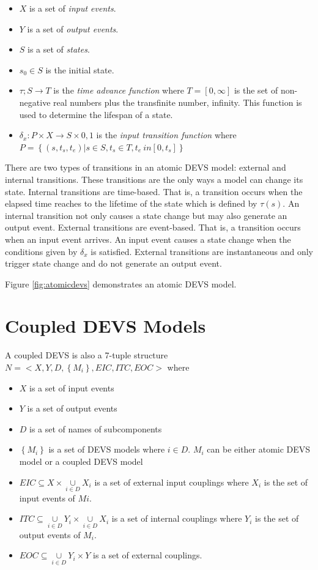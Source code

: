 \begin{itemize}
 \item $X$ is a set of \textit{input events}.
 \item $Y$ is a set of \textit{output events}.
 \item $S$ is a set of \textit{states}.
 \item $s_{0} \in S$ is the initial state.
 \item $\tau ; S \rightarrow T$ is the \textit{time advance function} where $T = [0,\infty]$ is the set of non-negative real numbers plus the transfinite number, infinity. This function is used to determine the lifespan of a state.
 \item $\delta_{x} : P \times X \rightarrow S \times {0,1}$ is the \textit{input transition function} where $P = \left\{(s, t_{s}, t_{e}) | s \in S, t_{s} \in T, t_{e} \ in [0, t_{s}]\right\}$
\end{itemize}

There are two types of transitions in an atomic DEVS model: external and internal transitions. These transitions are the only ways a model can change its state. Internal transitions are time-based. That is, a transition occurs when the elapsed time reaches to the lifetime of the state which is defined by $\tau(s)$. An internal transition not only causes a state change but may also generate an output event. External transitions are event-based. That is, a transition occurs when an input event arrives. An input event causes a state change when the conditions given by $\delta_{x}$ is satisfied. External transitions are instantaneous and only trigger state change and do not generate an output event.

Figure \ref{fig:atomicdevs} demonstrates an atomic DEVS model. 


\section{Coupled DEVS Models}

A coupled DEVS is also a 7-tuple structure \cite{Devspp} $N = < X, Y, D, \left\{M_{i}\right\}, EIC, ITC, EOC >$ where

\begin{itemize}
 \item $X$ is a set of input events
 \item $Y$ is a set of output events
 \item $D$ is a set of names of subcomponents
 \item $\left\{M_{i}\right\}$ is a set of DEVS models where $i \in D$. $M_{i}$ can be either atomic DEVS model or a coupled DEVS model
 \item $EIC \subseteq X \times \underset{i \in D}{\cup} X_{i}$ is a set of external input couplings where $X_{i}$ is the set of input events of $M{i}$.
 \item $ITC \subseteq \underset{i \in D}{\cup}Y_{i} \times \underset{i \in D}{\cup} X_{i}$ is a set of internal couplings where $Y_{i}$ is the set of output events of $M_{i}$.
 \item $EOC \subseteq \underset{i \in D}{\cup}Y_{i} \times Y$ is a set of external couplings.
\end{itemize}

